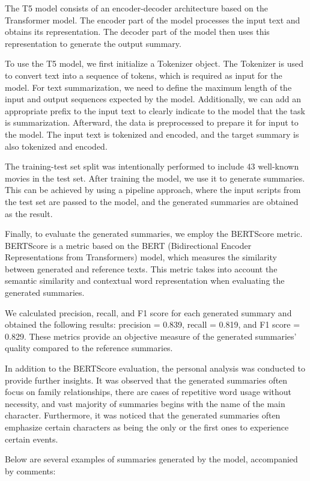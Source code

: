 \documentclass[fleqn,moreauthors,10pt]{ds_report}
\begin{document}
The T5 model consists of an encoder-decoder architecture based on the Transformer model. The encoder part of the model processes the input text and obtains its representation. The decoder part of the model then uses this representation to generate the output summary.

To use the T5 model, we first initialize a Tokenizer object. The Tokenizer is used to convert text into a sequence of tokens, which is required as input for the model.
For text summarization, we need to define the maximum length of the input and output sequences expected by the model. Additionally, we can add an appropriate prefix to the input text to clearly indicate to the model that the task is summarization.
Afterward, the data is preprocessed to prepare it for input to the model. The input text is tokenized and encoded, and the target summary is also tokenized and encoded.

The training-test set split was intentionally performed to include 43 well-known movies in the test set. 
After training the model, we use it to generate summaries. This can be achieved by using a pipeline approach, where the input scripts from the test set are passed to the model, and the generated summaries are obtained as the result.

Finally, to evaluate the generated summaries, we employ the BERTScore metric. BERTScore is a metric based on the BERT (Bidirectional Encoder Representations from Transformers) model, which measures the similarity between generated and reference texts. This metric takes into account the semantic similarity and contextual word representation when evaluating the generated summaries.

We calculated precision, recall, and F1 score for each generated summary and obtained the following results: precision = 0.839, recall = 0.819, and F1 score = 0.829. These metrics provide an objective measure of the generated summaries' quality compared to the reference summaries.

In addition to the BERTScore evaluation, the personal analysis was conducted to provide further insights. It was observed that the generated summaries often focus on family relationships, there are cases of repetitive word usage without necessity, and vast majority of summaries begins with the name of the main character. Furthermore, it was noticed that the generated summaries often emphasize certain characters as being the only or the first ones to experience certain events.

Below are several examples of summaries generated by the model, accompanied by comments:
\end{document}
